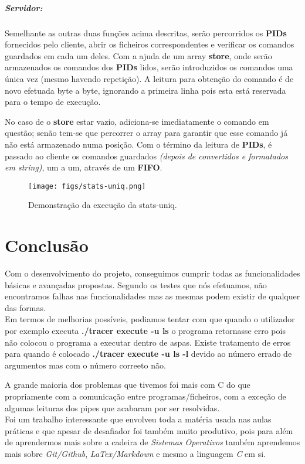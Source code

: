 \documentclass{report}
\begin{document}
\subparagraph{Servidor:}
Semelhante as outras duas funções acima descritas, serão percorridos os \textbf{PIDs} fornecidos pelo cliente, abrir os ficheiros correspondentes e verificar os comandos guardados em cada um deles. Com a ajuda de um array \textbf{store}, onde serão armazenados os comandos dos \textbf{PIDs} lidos, serão introduzidos os comandos uma única vez (mesmo havendo repetição). A leitura para obtenção do comando é de novo efetuada byte a byte, ignorando a primeira linha pois esta está reservada para o tempo de execução.\par
No caso de o \textbf{store} estar vazio, adiciona-se imediatamente o comando em questão; senão tem-se que percorrer o array para garantir que esse comando já não está armazenado numa posição.
Com o término da leitura de \textbf{PIDs}, é passado ao cliente os comandos guardados \textit{(depois de convertidos e formatados em string)}, um a um, através de um \textbf{FIFO}. 

\begin{figure}[h]
    \centering
    \texttt{[image: figs/stats-uniq.png]}
    \caption{Demonstração da execução da stats-uniq.}
    \label{f}
\end{figure}

\newpage
\section*{Conclusão}
Com o desenvolvimento do projeto, conseguimos cumprir todas as funcionalidades básicas e avançadas propostas. Segundo os testes que nós efetuamos, não encontramos falhas nas funcionalidades mas as mesmas podem existir de qualquer das formas.\\

Em termos de melhorias possíveis, podiamos tentar com que quando o utilizador por exemplo executa \textbf{./tracer execute -u ls} o programa retornasse erro pois não colocou o programa a executar dentro de aspas. Existe tratamento de erros para quando é colocado \textbf{./tracer execute -u ls -l} devido ao número errado de argumentos mas com o número correeto não.\par
A grande maioria dos problemas que tivemos foi mais com C do que propriamente com a comunicação entre programas/ficheiros, com a exceção de algumas leituras dos pipes que acabaram por ser resolvidas.\\

Foi um trabalho interessante que envolveu toda a matéria usada nas aulas práticas e que apesar de desafiador foi também muito produtivo, pois para além de aprendermos mais sobre a cadeira de \textit{Sistemas Operativos} também aprendemos mais sobre \textit{Git/Github}, \textit{LaTex/Markdown} e mesmo a linguagem \textit{C} em si.
\end{document}
